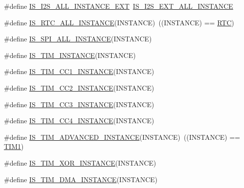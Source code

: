 \begin{DoxyCompactItemize}
\item 
\#define \hyperlink{group___exported__macros_ga839b019f23ec240da66dd50a21ab5025}{I\+S\+\_\+\+I2\+S\+\_\+\+A\+L\+L\+\_\+\+I\+N\+S\+T\+A\+N\+C\+E\+\_\+\+E\+XT}~\hyperlink{group___exported__macros_ga2f0d621c72fe4e5039562472460e29ab}{I\+S\+\_\+\+I2\+S\+\_\+\+E\+X\+T\+\_\+\+A\+L\+L\+\_\+\+I\+N\+S\+T\+A\+N\+CE}
\item 
\#define \hyperlink{group___exported__macros_gab4230e8bd4d88adc4250f041d67375ce}{I\+S\+\_\+\+R\+T\+C\+\_\+\+A\+L\+L\+\_\+\+I\+N\+S\+T\+A\+N\+CE}(I\+N\+S\+T\+A\+N\+CE)~((I\+N\+S\+T\+A\+N\+CE) == \hyperlink{group___peripheral__declaration_ga5359a088f5d8b20ce74d920e46059304}{R\+TC})
\item 
\#define \hyperlink{group___exported__macros_ga59c7619a86c03df3ebeb4bd8aaef982c}{I\+S\+\_\+\+S\+P\+I\+\_\+\+A\+L\+L\+\_\+\+I\+N\+S\+T\+A\+N\+CE}(I\+N\+S\+T\+A\+N\+CE)
\item 
\#define \hyperlink{group___exported__macros_gaba506eb03409b21388d7c5a6401a4f98}{I\+S\+\_\+\+T\+I\+M\+\_\+\+I\+N\+S\+T\+A\+N\+CE}(I\+N\+S\+T\+A\+N\+CE)
\item 
\#define \hyperlink{group___exported__macros_ga0c02efc77b1bfb640d7f6593f58ad464}{I\+S\+\_\+\+T\+I\+M\+\_\+\+C\+C1\+\_\+\+I\+N\+S\+T\+A\+N\+CE}(I\+N\+S\+T\+A\+N\+CE)
\item 
\#define \hyperlink{group___exported__macros_ga6ef84d278cf917c7e420b94687b39c7c}{I\+S\+\_\+\+T\+I\+M\+\_\+\+C\+C2\+\_\+\+I\+N\+S\+T\+A\+N\+CE}(I\+N\+S\+T\+A\+N\+CE)
\item 
\#define \hyperlink{group___exported__macros_ga0c37cb8f925fd43622cce7a4c00fd95e}{I\+S\+\_\+\+T\+I\+M\+\_\+\+C\+C3\+\_\+\+I\+N\+S\+T\+A\+N\+CE}(I\+N\+S\+T\+A\+N\+CE)
\item 
\#define \hyperlink{group___exported__macros_gae72b7182a73d81c33196265b31091c07}{I\+S\+\_\+\+T\+I\+M\+\_\+\+C\+C4\+\_\+\+I\+N\+S\+T\+A\+N\+CE}(I\+N\+S\+T\+A\+N\+CE)
\item 
\#define \hyperlink{group___exported__macros_ga7e85353dbe9dc9d80ad06f0b935c12e1}{I\+S\+\_\+\+T\+I\+M\+\_\+\+A\+D\+V\+A\+N\+C\+E\+D\+\_\+\+I\+N\+S\+T\+A\+N\+CE}(I\+N\+S\+T\+A\+N\+CE)~((I\+N\+S\+T\+A\+N\+CE) == \hyperlink{group___peripheral__declaration_ga2e87451fea8dc9380056d3cfc5ed81fb}{T\+I\+M1})
\item 
\#define \hyperlink{group___exported__macros_ga6e06388143bb7bb111c78a3686dd753a}{I\+S\+\_\+\+T\+I\+M\+\_\+\+X\+O\+R\+\_\+\+I\+N\+S\+T\+A\+N\+CE}(I\+N\+S\+T\+A\+N\+CE)
\item 
\#define \hyperlink{group___exported__macros_gad51d77b3bcc12a3a5c308d727b561371}{I\+S\+\_\+\+T\+I\+M\+\_\+\+D\+M\+A\+\_\+\+I\+N\+S\+T\+A\+N\+CE}(I\+N\+S\+T\+A\+N\+CE)

\end{DoxyCompactItemize}
